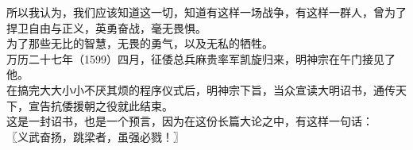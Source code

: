 \begin{multicols}{\theparacolNo}
所以我认为，我们应该知道这一切，知道有这样一场战争，有这样一群人，曾为了捍卫自由与正义，英勇奋战，毫无畏惧。\\

为了那些无比的智慧，无畏的勇气，以及无私的牺牲。\\

万历二十七年（1599）四月，征倭总兵麻贵率军凯旋归来，明神宗在午门接见了他。\\

在搞完大大小小不厌其烦的程序仪式后，明神宗下旨，当众宣读大明诏书，通传天下，宣告抗倭援朝之役就此结束。\\

这是一封诏书，也是一个预言，因为在这份长篇大论之中，有这样一句话：\\

〖义武奋扬，跳梁者，虽强必戮！〗\\
\ifnum{}
	\end{multicols}
\fi